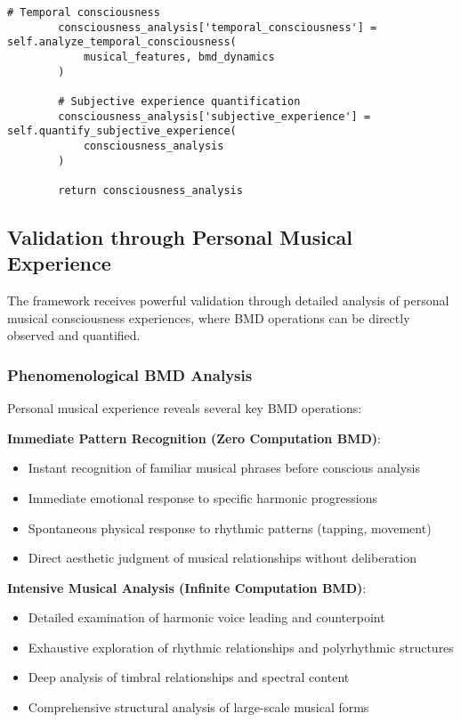 \documentclass[12pt,a4paper]{article}
\begin{document}
\begin{lstlisting}[style=pythonstyle, caption=Complete Musical Consciousness Analysis]
        # Temporal consciousness
        consciousness_analysis['temporal_consciousness'] = self.analyze_temporal_consciousness(
            musical_features, bmd_dynamics
        )
        
        # Subjective experience quantification
        consciousness_analysis['subjective_experience'] = self.quantify_subjective_experience(
            consciousness_analysis
        )
        
        return consciousness_analysis
\end{lstlisting}

\subsection{Validation through Personal Musical Experience}

The framework receives powerful validation through detailed analysis of personal musical consciousness experiences, where BMD operations can be directly observed and quantified.

\subsubsection{Phenomenological BMD Analysis}

Personal musical experience reveals several key BMD operations:

\textbf{Immediate Pattern Recognition (Zero Computation BMD)}:
\begin{itemize}
\item Instant recognition of familiar musical phrases before conscious analysis
\item Immediate emotional response to specific harmonic progressions
\item Spontaneous physical response to rhythmic patterns (tapping, movement)
\item Direct aesthetic judgment of musical relationships without deliberation
\end{itemize}

\textbf{Intensive Musical Analysis (Infinite Computation BMD)}:
\begin{itemize}
\item Detailed examination of harmonic voice leading and counterpoint
\item Exhaustive exploration of rhythmic relationships and polyrhythmic structures
\item Deep analysis of timbral relationships and spectral content
\item Comprehensive structural analysis of large-scale musical forms
\end{itemize}
\end{document}
